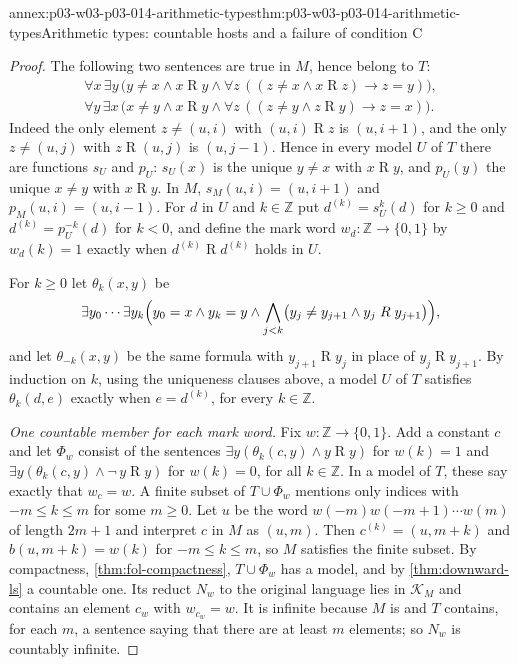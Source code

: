 \begin{annexitem}{annex:p03-w03-p03-014-arithmetic-types}{thm:p03-w03-p03-014-arithmetic-types}{Arithmetic types: countable hosts and a failure of condition C}
\begin{proof}
The following two sentences are true in \(M\), hence belong to \(T\):
\[
\begin{gathered}
 \forall x\,\exists y\,\bigl(y\neq x\land x\mathrel Ry\land
   \forall z\,((z\neq x\land x\mathrel Rz)\to z=y)\bigr),\\
 \forall y\,\exists x\,\bigl(x\neq y\land x\mathrel Ry\land
   \forall z\,((z\neq y\land z\mathrel Ry)\to z=x)\bigr).
\end{gathered}
\]
Indeed the only element \(z\neq(u,i)\) with \((u,i)\mathrel Rz\) is
\((u,i+1)\), and the only \(z\neq(u,j)\) with \(z\mathrel R(u,j)\) is
\((u,j-1)\). Hence in every model \(U\) of \(T\) there are functions
\(s_U\) and \(p_U\): \(s_U(x)\) is the unique \(y\neq x\) with
\(x\mathrel Ry\), and \(p_U(y)\) the unique \(x\neq y\) with
\(x\mathrel Ry\). In \(M\), \(s_M(u,i)=(u,i+1)\) and
\(p_M(u,i)=(u,i-1)\). For \(d\) in \(U\) and \(k\in\mathbb Z\) put
\(d^{(k)}=s_U^k(d)\) for \(k\geq0\) and \(d^{(k)}=p_U^{-k}(d)\) for
\(k<0\), and define the mark word \(w_d:\mathbb Z\to\{0,1\}\) by
\(w_d(k)=1\) exactly when \(d^{(k)}\mathrel Rd^{(k)}\) holds in \(U\).

For \(k\geq0\) let \(\theta_k(x,y)\) be
\[
 \exists y_0\cdots\exists y_k\Bigl(y_0=x\land y_k=y\land
 \bigwedge_{j<k}\bigl(y_j\neq y_{j+1}\land y_j\mathrel Ry_{j+1}\bigr)\Bigr),
\]
and let \(\theta_{-k}(x,y)\) be the same formula with
\(y_{j+1}\mathrel Ry_j\) in place of \(y_j\mathrel Ry_{j+1}\). By
induction on \(k\), using the uniqueness clauses above, a model \(U\) of
\(T\) satisfies \(\theta_k(d,e)\) exactly when \(e=d^{(k)}\), for every
\(k\in\mathbb Z\).

\emph{One countable member for each mark word.} Fix
\(w:\mathbb Z\to\{0,1\}\). Add a constant \(c\) and let \(\Phi_w\)
consist of the sentences \(\exists y(\theta_k(c,y)\land y\mathrel Ry)\)
for \(w(k)=1\) and \(\exists y(\theta_k(c,y)\land\neg\,y\mathrel Ry)\)
for \(w(k)=0\), for all \(k\in\mathbb Z\). In a model of \(T\), these say
exactly that \(w_c=w\). A finite subset of \(T\cup\Phi_w\) mentions
only indices with \(-m\leq k\leq m\) for some \(m\geq0\). Let \(u\) be the word
\(w(-m)w(-m+1)\cdots w(m)\) of length \(2m+1\) and interpret \(c\) in
\(M\) as \((u,m)\). Then \(c^{(k)}=(u,m+k)\) and
\(b(u,m+k)=w(k)\) for \(-m\leq k\leq m\), so \(M\) satisfies the finite
subset. By compactness, \cref{thm:fol-compactness}, \(T\cup\Phi_w\) has a
model, and by \cref{thm:downward-ls} a countable one. Its reduct
\(N_w\) to the original language lies in \(\mathcal K_M\) and contains
an element \(c_w\) with \(w_{c_w}=w\). It is infinite because \(M\) is
and \(T\) contains, for each \(m\), a sentence saying that there are at
least \(m\) elements; so \(N_w\) is countably infinite.


\end{proof}
\end{annexitem}
